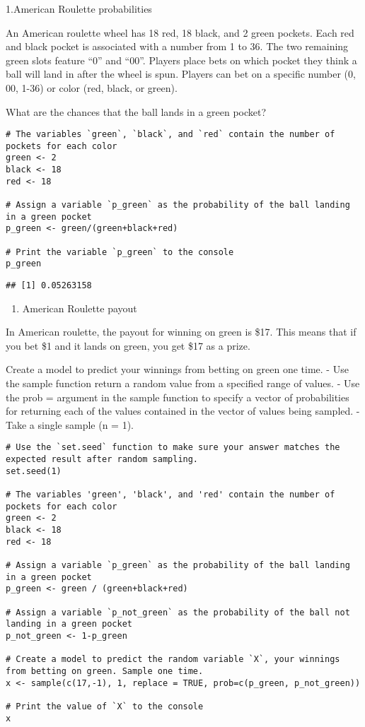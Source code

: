 \documentclass[
]{article}
\providecommand{\tightlist}{%
  \setlength{\itemsep}{0pt}\setlength{\parskip}{0pt}}
\begin{document}
1.American Roulette probabilities

An American roulette wheel has 18 red, 18 black, and 2 green pockets.
Each red and black pocket is associated with a number from 1 to 36. The
two remaining green slots feature ``0'' and ``00''. Players place bets
on which pocket they think a ball will land in after the wheel is spun.
Players can bet on a specific number (0, 00, 1-36) or color (red, black,
or green).

What are the chances that the ball lands in a green pocket?

\begin{verbatim}
# The variables `green`, `black`, and `red` contain the number of pockets for each color
green <- 2
black <- 18
red <- 18

# Assign a variable `p_green` as the probability of the ball landing in a green pocket
p_green <- green/(green+black+red)

# Print the variable `p_green` to the console
p_green
\end{verbatim}

\begin{verbatim}
## [1] 0.05263158
\end{verbatim}

\begin{enumerate}
\def\labelenumi{\arabic{enumi}.}
\setcounter{enumi}{1}
\tightlist
\item
  American Roulette payout
\end{enumerate}

In American roulette, the payout for winning on green is \$17. This
means that if you bet \$1 and it lands on green, you get \$17 as a
prize.

Create a model to predict your winnings from betting on green one time.
- Use the sample function return a random value from a specified range
of values. - Use the prob = argument in the sample function to specify a
vector of probabilities for returning each of the values contained in
the vector of values being sampled. - Take a single sample (n = 1).

\begin{verbatim}
# Use the `set.seed` function to make sure your answer matches the expected result after random sampling.
set.seed(1)

# The variables 'green', 'black', and 'red' contain the number of pockets for each color
green <- 2
black <- 18
red <- 18

# Assign a variable `p_green` as the probability of the ball landing in a green pocket
p_green <- green / (green+black+red)

# Assign a variable `p_not_green` as the probability of the ball not landing in a green pocket
p_not_green <- 1-p_green

# Create a model to predict the random variable `X`, your winnings from betting on green. Sample one time.
x <- sample(c(17,-1), 1, replace = TRUE, prob=c(p_green, p_not_green))

# Print the value of `X` to the console
x
\end{verbatim}
\end{document}
